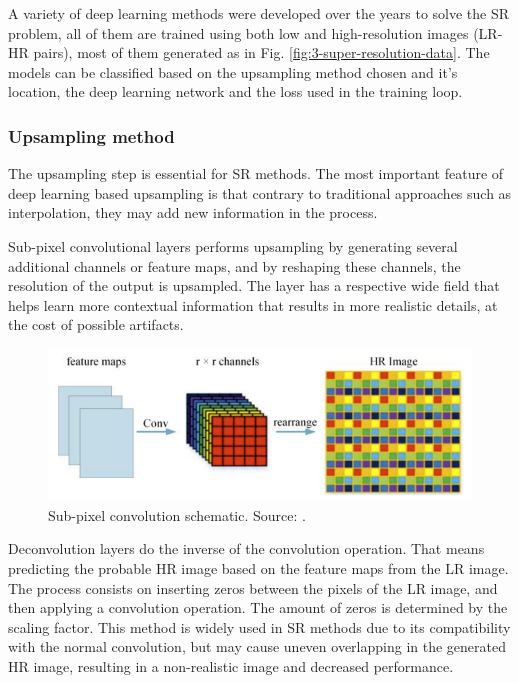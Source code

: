         A variety of deep learning methods were developed over the years to solve the SR problem, all of them are trained using both low and high-resolution images (LR-HR pairs), most of them generated as in Fig. \ref{fig:3-super-resolution-data}. The models can be classified based on the upsampling method chosen and it's location, the deep learning network and the loss used in the training loop.


        \subsubsection{Upsampling method}

        The upsampling step is essential for SR methods. The most important feature of deep learning based upsampling  is that contrary to traditional approaches such as interpolation, they may add new information in the process.

        Sub-pixel convolutional layers performs upsampling by generating several additional channels or feature maps, and by reshaping these channels, the resolution of the output is upsampled. The layer has a respective wide field that helps learn more contextual information that results in more realistic details, at the cost of possible artifacts.
        
        \begin{figure}[H]
            \centering
            \includegraphics[width=\textwidth]{Includes/2-sub-pixel-convolution.png}
            \caption{Sub-pixel convolution schematic. Source: \cite{Liu2019}.}
            \label{fig:2-sub-pixel-convolution}
        \end{figure}


        

        Deconvolution layers do the inverse of the convolution operation. 
        That means predicting the probable HR image based on the feature maps from the LR image. The process consists on inserting zeros between the pixels of the LR image, and then applying a convolution operation. The amount of zeros is determined by the scaling factor. This method is widely used in SR methods due to its compatibility with the normal convolution, but may cause uneven overlapping in the generated HR image, resulting in a non-realistic image and decreased performance.

